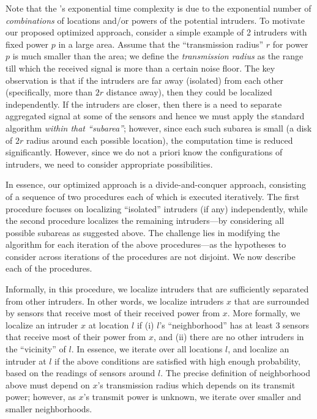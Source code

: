   Note that the \mll's exponential time complexity
is due to the exponential number of {\em combinations} of locations
and/or powers of the potential intruders. To motivate our proposed
optimized approach, consider a simple example of 2 intruders with
fixed power $p$ in a large area. Assume that the ``transmission
radius'' $r$ for power $p$ is much smaller than the area; we define
the {\em transmission radius} as the range till which the received
signal is more than a certain noise floor.
The key observation is that if the intruders are far away (isolated)
from each other (specifically, more than $2r$ distance away), then
they could be localized independently. If the intruders are closer,
then there is a need to separate aggregated signal at some of the
sensors and hence we must apply the standard \mll algorithm {\em
  within that ``subarea''}; however, since each such subarea is small
(a disk of $2r$ radius around each possible location), the computation
time is reduced significantly. However, since we do not a priori know
the configurations of intruders, we need to consider appropriate
possibilities.

In essence, our optimized approach is a divide-and-conquer approach,
consisting of a sequence of two procedures each of which is executed
iteratively. The first procedure focuses on localizing ``isolated''
intruders (if any) independently, while the second procedure localizes
the remaining intruders---by considering all possible subareas as
suggested above. The challenge lies in modifying the \mll algorithm
for each iteration of the above procedures---as the hypotheses to
consider across iterations of the procedures are not disjoint. We now
describe each of the procedures.

  Informally, in this
procedure, we localize intruders that are sufficiently separated from
other intruders. In other words, we localize intruders $x$ that are
surrounded by sensors that receive most of their received power from
$x$. More formally, we localize an intruder $x$ at location $l$ if (i)
$l$'s ``neighborhood'' has at least 3 sensors that receive most of
their power from $x$, and (ii) there are no other intruders in the
``vicinity'' of $l$. In essence, we iterate over all locations $l$,
and localize an intruder at $l$ if the above conditions are satisfied
with high enough probability, based on the readings of sensors around
$l$.
The precise definition of neighborhood above must depend on $x$'s
transmission radius which depends on its transmit power; however, as
$x$'s transmit power is unknown, we iterate over smaller and smaller
neighborhoods.

